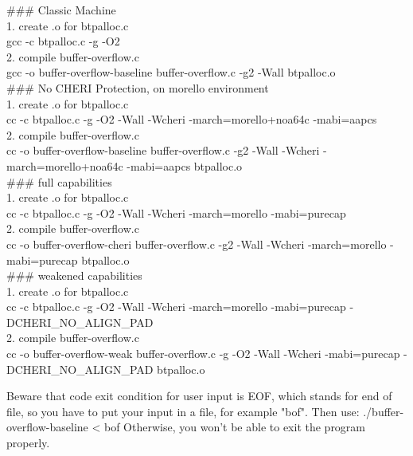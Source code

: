 \documentclass[a4paper, 11pt]{article}
\begin{document}
			
		\begin{tcolorbox}[colback=gray!5!white, colframe=red!75!blue, title=How to compile]
			\#\#\# Classic Machine\\
			1. create .o for btpalloc.c\\
			gcc -c btpalloc.c -g -O2\\
			2. compile buffer-overflow.c\\
			gcc -o buffer-overflow-baseline buffer-overflow.c -g2 -Wall btpalloc.o\\
			
			\#\#\# No CHERI Protection, on morello environment\\
			1. create .o for btpalloc.c\\
			cc -c btpalloc.c -g -O2 -Wall -Wcheri -march=morello+noa64c -mabi=aapcs\\
			2. compile buffer-overflow.c\\
			cc -o buffer-overflow-baseline buffer-overflow.c -g2 -Wall -Wcheri -march=morello+noa64c -mabi=aapcs btpalloc.o\\
			\#\#\# full capabilities\\
			1. create .o for btpalloc.c\\
			cc -c btpalloc.c -g -O2 -Wall -Wcheri -march=morello -mabi=purecap\\
			2. compile buffer-overflow.c\\
			cc -o buffer-overflow-cheri buffer-overflow.c -g2 -Wall -Wcheri -march=morello -mabi=purecap btpalloc.o\\
			\#\#\# weakened capabilities\\
			1. create .o for btpalloc.c\\
			cc -c btpalloc.c -g -O2 -Wall -Wcheri -march=morello -mabi=purecap -DCHERI\_NO\_ALIGN\_PAD\\
			2. compile buffer-overflow.c\\
			cc -o buffer-overflow-weak buffer-overflow.c -g -O2 -Wall -Wcheri -mabi=purecap -DCHERI\_NO\_ALIGN\_PAD btpalloc.o\\
		\end{tcolorbox}
		Beware that code exit condition for user input is EOF, which stands for end of file, so you have to put your input in a file, for example "bof".
		Then use: ./buffer-overflow-baseline < bof
		Otherwise, you won't be able to exit the program properly.
	
\end{document}
